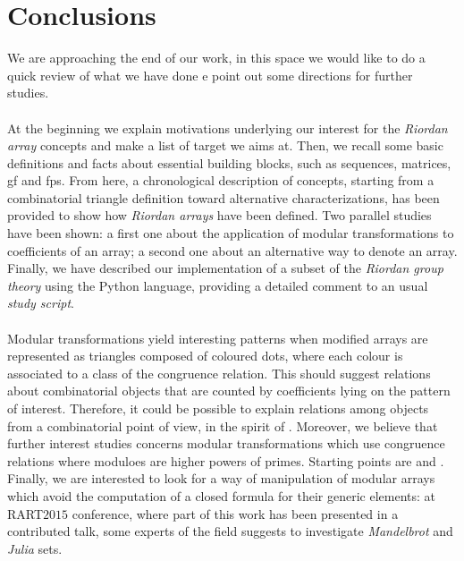 
\chapter{Conclusions}
\label{ch:conclusions}

We are approaching the end of our work, in this space we would like
to do a quick review of what we have done e point out some directions
for further studies.
\\\\

At the beginning we explain motivations underlying our interest for the
\emph{Riordan array} concepts and make a list of target we aims at.  Then, we
recall some basic definitions and facts about essential building blocks, such
as sequences, matrices, \ac{gf} and \ac{fps}. From here, a chronological
description of concepts, starting from a combinatorial triangle definition
toward alternative characterizations, has been provided to show how
\emph{Riordan arrays} have been defined. Two parallel studies have been shown:
a first one about the application of modular transformations to coefficients of
an array; a second one about an alternative way to denote an array.  Finally,
we have described our implementation of a subset of the \emph{Riordan group
theory} using the Python language, providing a detailed comment to an usual
\emph{study script}.
\\\\
\indent Modular transformations yield interesting patterns when modified arrays
are represented as triangles composed of coloured dots, where each colour is
associated to a class of the congruence relation. This should suggest relations
about combinatorial objects that are counted by coefficients lying on the
pattern of interest. Therefore, it could be possible to explain relations among
objects from a combinatorial point of view, in the spirit of
\cite{benjamin:quinn:proofs:really:count}. Moreover, we believe that further
interest studies concerns modular transformations which use congruence
relations where moduloes are higher powers of primes. Starting points are
\cite{sved:1988} and \cite{mclean:1974}.  Finally, we are interested to look
for a way of manipulation of modular arrays which avoid the computation of a
closed formula for their generic elements: at RART$2015$ conference, where
part of this work has been presented in a contributed talk, some experts of
the field suggests to investigate \emph{Mandelbrot} and \emph{Julia} sets.
\\\\
